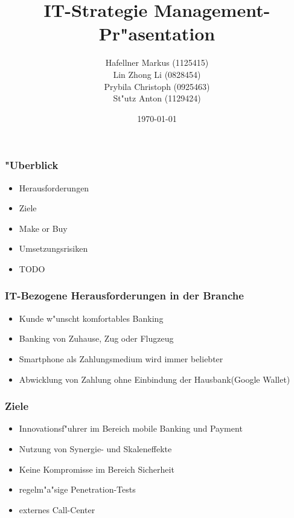 \documentclass{beamer}
\title{IT-Strategie Management-Pr"asentation}
\author{ Hafellner Markus (1125415)\\
 Lin Zhong Li (0828454)\\
 Prybila Christoph (0925463)\\
 St"utz Anton (1129424)\\
}
\date{\today}
\begin{document}
\maketitle


\begin{frame}

  \frametitle{"Uberblick}
  
  \begin{itemize}

	\item Herausforderungen
	\item Ziele
	\item Make or Buy
	\item Umsetzungsrisiken
	\item TODO

  \end{itemize}
\end{frame}

\begin{frame}

  \frametitle{IT-Bezogene Herausforderungen in der Branche}
  \begin{itemize}

	\item Kunde w"unscht komfortables Banking
	\item Banking von Zuhause, Zug oder Flugzeug
	\item Smartphone als Zahlungsmedium wird immer beliebter
	\item Abwicklung von Zahlung ohne Einbindung der Hausbank(Google Wallet)

  \end{itemize}
\end{frame}

\begin{frame}

  \frametitle{Ziele}
  \begin{itemize}

	\item Innovationsf"uhrer im Bereich mobile Banking und Payment
	\item Nutzung von Synergie- und Skaleneffekte
	\item Keine Kompromisse im Bereich Sicherheit
	\item regelm"a"sige Penetration-Tests
	\item externes Call-Center

  \end{itemize}
\end{frame}
\end{document}
